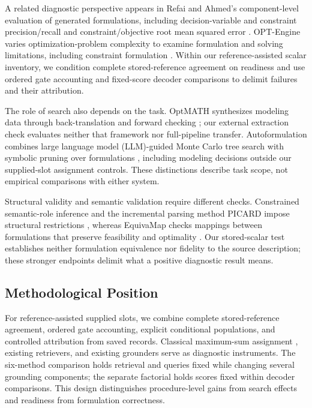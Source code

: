 \documentclass[pdflatex,iicol,sn-basic,Numbered]{sn-jnl}
\begin{document}
A related diagnostic perspective appears in Refai and Ahmed's component-level evaluation of generated formulations, including decision-variable and constraint precision/recall and constraint/objective root mean squared error \cite{refai2026component}. OPT-Engine varies optimization-problem complexity to examine formulation and solving limitations, including constraint formulation \cite{chen2026optengine}. Within our reference-assisted scalar inventory, we condition complete stored-reference agreement on readiness and use ordered gate accounting and fixed-score decoder comparisons to delimit failures and their attribution.

The role of search also depends on the task. OptMATH synthesizes modeling data through back-translation and forward checking \cite{lu2025optmath}; our external extraction check evaluates neither that framework nor full-pipeline transfer. Autoformulation combines large language model (LLM)-guided Monte Carlo tree search with symbolic pruning over formulations \cite{astorga2025autoformulation}, including modeling decisions outside our supplied-slot assignment controls. These distinctions describe task scope, not empirical comparisons with either system.

Structural validity and semantic validation require different checks. Constrained semantic-role inference and the incremental parsing method PICARD impose structural restrictions \cite{punyakanok2004ilp,scholak2021picard}, whereas EquivaMap checks mappings between formulations that preserve feasibility and optimality \cite{zhai2025equivamap}. Our stored-scalar test establishes neither formulation equivalence nor fidelity to the source description; these stronger endpoints delimit what a positive diagnostic result means.

\subsection{Methodological Position}
\label{subsec:rw_position}
For reference-assisted supplied slots, we combine complete stored-reference agreement, ordered gate accounting, explicit conditional populations, and controlled attribution from saved records. Classical maximum-sum assignment \cite{kuhn1955assignment}, existing retrievers, and existing grounders serve as diagnostic instruments. The six-method comparison holds retrieval and queries fixed while changing several grounding components; the separate factorial holds scores fixed within decoder comparisons. This design distinguishes procedure-level gains from search effects and readiness from formulation correctness.
\end{document}
